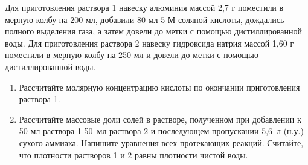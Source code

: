 
Для приготовления раствора 1 навеску алюминия массой 2,7 г поместили в мерную колбу на 200 мл, добавили 80 мл 5 М 
соляной кислоты, дождались полного выделения газа, а затем довели до метки с помощью дистиллированной воды. Для 
приготовления раствора 2 навеску гидроксида натрия массой 1,60 г поместили в мерную колбу на 250 мл и довели до 
метки с помощью дистиллированной воды.

\begin{enumerate}
    \item Рассчитайте молярную концентрацию кислоты по окончании приготовления раствора 1.
    \item Рассчитайте массовые доли солей в растворе, полученном при добавлении к 50 мл раствора 1 50~мл 
    раствора 2 и последующем пропускании 5,6~л (н.у.) сухого аммиака. Напишите уравнения всех протекающих реакций. 
    Считайте, что плотности растворов 1 и 2 равны плотности чистой воды.
\end{enumerate}